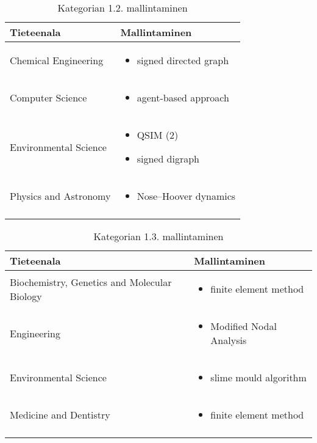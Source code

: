 \documentclass[utf8]{gradu3}
\begin{document}
\begin{longtable}[h]{|p{5cm}|p{8cm}|}
    \hline
    \textbf{Tieteenala}    &    \textbf{Mallintaminen}\\
    \hline
    Chemical Engineering & \begin{itemize}
        \item signed directed graph
    \end{itemize} \\
    \hline
    Computer Science & \begin{itemize}
        \item agent-based approach
    \end{itemize} \\
    \hline
    Environmental Science & \begin{itemize}
        \item QSIM (2)
        \item signed digraph
    \end{itemize} \\
    \hline
    Physics and Astronomy & \begin{itemize}
        \item Nose–Hoover dynamics
    \end{itemize} \\
    \hline
    \caption{Kategorian 1.2. mallintaminen}
    \label{table:Kategorian 1.2. mallintaminen}
\end{longtable}

\begin{longtable}[h]{|p{5cm}|p{8cm}|}
    \hline
    \textbf{Tieteenala}    &    \textbf{Mallintaminen}\\
    \hline
    Biochemistry, Genetics and Molecular Biology & \begin{itemize}
        \item finite element method
    \end{itemize} \\
    \hline
    Engineering & \begin{itemize}
        \item Modified Nodal Analysis
    \end{itemize} \\
    \hline
    Environmental Science & \begin{itemize}
        \item slime mould algorithm
    \end{itemize} \\
    \hline
    Medicine and Dentistry & \begin{itemize}
        \item finite element method
    \end{itemize} \\
    \hline
    \caption{Kategorian 1.3. mallintaminen}
    \label{table:Kategorian 1.3. mallintaminen}
\end{longtable}
\end{document}
